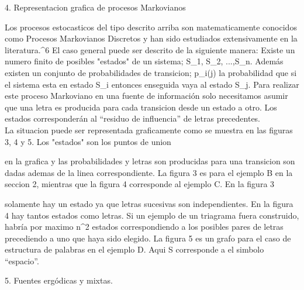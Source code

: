 4. Representacion grafica de procesos Markovianos

Los procesos estocasticos del tipo descrito arriba son matematicamente conocidos como Procesos Markovianos Discretos y han sido estudiados extensivamente en la literatura.^{6} El caso general puede ser descrito de la siguiente manera: Existe un numero finito de posibles "estados" de un sistema; S_{1}, S_{2}, ...,S_{n}. Adem\'{a}s existen un conjunto de probabilidades de transicion; p_{i}(j) la probabilidad que si el sistema esta en estado S_{i} entonces enseguida vaya al estado S_{j}. Para realizar este proceso Markoviano en una fuente de información solo necesitamos asumir que una letra es producida para cada transicion desde un estado a otro. Los estados corresponderán al ``residuo de influencia'' de letras precedentes. \\
La situacion puede ser representada graficamente como se muestra en las figuras 3, 4 y 5. Los "estados" son los puntos de union


en la grafica y las probabilidades y letras son producidas para una transicion son dadas ademas de la linea correspondiente. La figura 3 es para el ejemplo B en la seccion 2, mientras que la figura 4 corresponde al ejemplo C. En la figura 3


solamente hay un estado ya que letras sucesivas son independientes. En la figura 4 hay tantos estados como letras. \newline
Si un ejemplo de un triagrama fuera construido, habr\'{i}a por maximo n^{2} estados correspondiendo a los posibles pares de letras precediendo a uno que haya sido elegido. La figura 5 es un grafo para el caso de estructura de palabras en el ejemplo D. Aqui S corresponde a el simbolo ``espacio''. \newline

5. Fuentes erg\'{o}dicas y mixtas.

